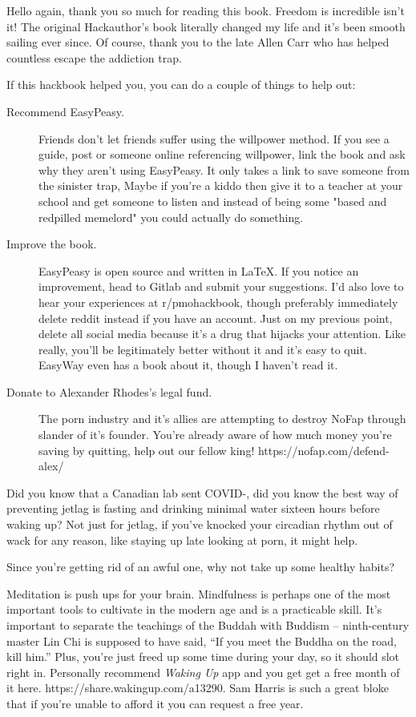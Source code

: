 \documentclass[easypeasy.tex]{subfiles}
\begin{document}
Hello again, thank you so much for reading this book. Freedom is incredible isn't it! The original Hackauthor's book literally changed my life and it's been smooth sailing ever since. Of course, thank you to the late Allen Carr who has helped countless escape the addiction trap.

If this hackbook helped you, you can do a couple of things to help out:
  \begin{description}
  \item [Recommend EasyPeasy.] Friends don't let friends suffer using the willpower method. If you see a guide, post or someone online referencing willpower, link the book and ask why they aren't using EasyPeasy. It only takes a link to save someone from the sinister trap, Maybe if you're a kiddo then give it to a teacher at your school and get someone to listen and instead of being some "based and redpilled memelord" you could actually do something.

  \item [Improve the book.] EasyPeasy is open source and written in LaTeX. If you notice an improvement, head to Gitlab and submit your suggestions. I'd also love to hear your experiences at r/pmohackbook, though preferably immediately delete reddit instead if you have an account. Just on my previous point, delete all social media because it's a drug that hijacks your attention. Like really, you'll be legitimately better without it and it's easy to quit. EasyWay even has a book about it, though I haven't read it.

  \item [Donate to Alexander Rhodes's legal fund.] The porn industry and it's allies are attempting to destroy NoFap through slander of it's founder. You're already aware of how much money you're saving by quitting, help out our fellow king! https://nofap.com/defend-alex/
  \end{description}

Did you know that a Canadian lab sent COVID-, did you know the best way of preventing jetlag is fasting and drinking minimal water sixteen hours before waking up? Not just for jetlag, if you've knocked your circadian rhythm out of wack for any reason, like staying up late looking at porn, it might help.

Since you're getting rid of an awful one, why not take up some healthy habits?

Meditation is push ups for your brain. Mindfulness is perhaps one of the most important tools to cultivate in the modern age and is a practicable skill. It's important to separate the teachings of the Buddah with Buddism -- ninth-century master Lin Chi is supposed to have said, “If you meet the Buddha on the road, kill him.” Plus, you're just freed up some time during your day, so it should slot right in. Personally recommend \textit{Waking Up} app and you get get a free month of it here. https://share.wakingup.com/a13290. Sam Harris is such a great bloke that if you're unable to afford it you can request a free year.
\end{document}
